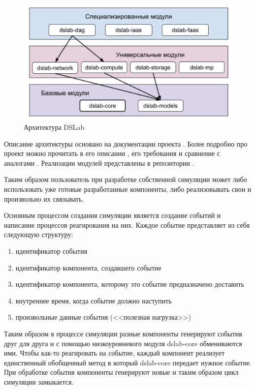 \begin{figure}[H]
    \centering
    \includegraphics[width=0.7\linewidth]{images/dslab_arc.png}
    \caption{Архитектура DSLab}
    \label{dslab_arc}
\end{figure}

Описание архитектуры основано на документации проекта \cite{dslab-architecture}. Более подробно про проект можно прочитать в его описании \cite{dslab-description}, его требования \cite{dslab-requirements} и сравнение с аналогами \cite{dslab-analog-cmp}. Реализации модулей представлены в репозитории \cite{dslab-repo}.

Таким образом пользователь при разработке собственной симуляции может либо использовать уже готовые разработанные компоненты, либо реализовывать свои и произвольно их связывать. 


Основным процессом создания симуляции является создание событий и написание процессов реагирования на них. Каждое событие представляет из себя следующую структуру: 
\begin{enumerate}
    \item идентификатор события 
    \item идентификатор компонента, создавшего событие 
    \item идентификатор компонента, которому это событие предназначено доставить 
    \item внутреннее время, когда событие должно наступить
    \item произвольные данные события (<<полезная нагрузка>>)
\end{enumerate}

Таким образом в процессе симуляции разные компоненты генерируют события друг для друга и с помощью низкоуровневого модуля dslab-core обмениваются ими. Чтобы как-то реагировать на событие, каждый компонент реализует единственный обобщенный метод в который dslab-core передает нужное событие. При обработке события компоненты генерируют новые и таким образом цикл симуляции замыкается. 

